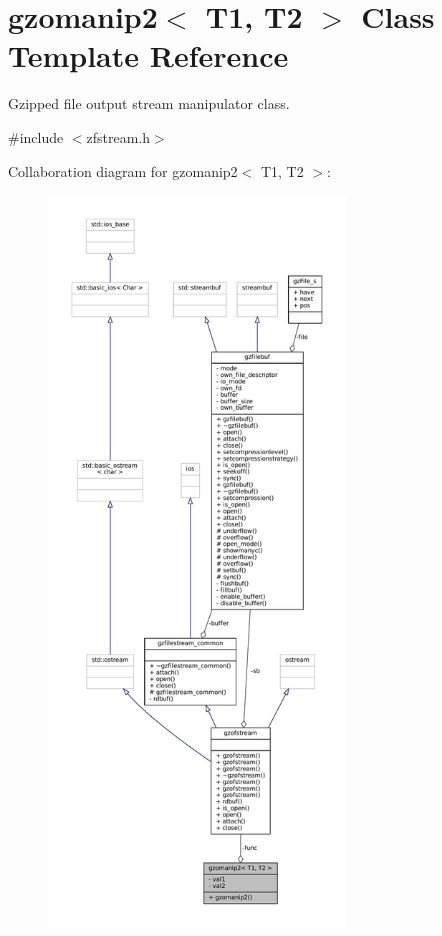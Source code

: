 \hypertarget{classgzomanip2}{}\section{gzomanip2$<$ T1, T2 $>$ Class Template Reference}
\label{classgzomanip2}


Gzipped file output stream manipulator class.  




{\ttfamily \#include $<$zfstream.\+h$>$}



Collaboration diagram for gzomanip2$<$ T1, T2 $>$\+:
\nopagebreak
\begin{figure}[H]
\begin{center}
\leavevmode
\includegraphics[height=550pt]{classgzomanip2__coll__graph}
\end{center}
\end{figure}
